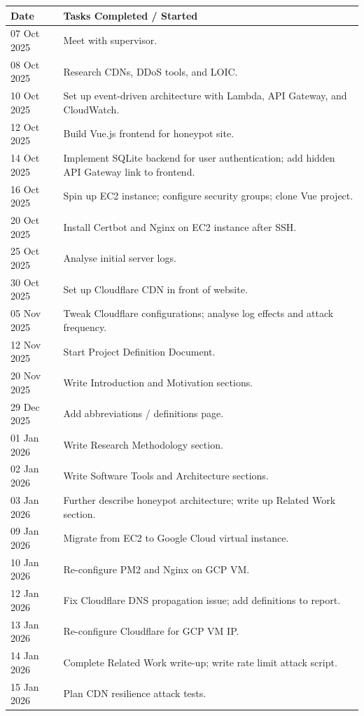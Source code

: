 \documentclass[12pt, a4paper]{report}   %
\begin{document}
\begin{longtable}{p{3cm} p{11cm}}
  \toprule
  \textbf{Date} & \textbf{Tasks Completed / Started} \\
  \midrule
  \endhead
  07 Oct 2025  & Meet with supervisor. \\
  08 Oct 2025  & Research CDNs, DDoS tools, and LOIC. \\
  10 Oct 2025  & Set up event-driven architecture with Lambda, API Gateway, and CloudWatch. \\
  12 Oct 2025  & Build Vue.js frontend for honeypot site. \\
  14 Oct 2025  & Implement SQLite backend for user authentication; add hidden API Gateway link to frontend. \\
  16 Oct 2025  & Spin up EC2 instance; configure security groups; clone Vue project. \\
  20 Oct 2025  & Install Certbot and Nginx on EC2 instance after SSH. \\
  25 Oct 2025  & Analyse initial server logs. \\
  30 Oct 2025  & Set up Cloudflare CDN in front of website. \\
  05 Nov 2025  & Tweak Cloudflare configurations; analyse log effects and attack frequency. \\
  12 Nov 2025  & Start Project Definition Document. \\
  20 Nov 2025  & Write Introduction and Motivation sections. \\
  29 Dec 2025  & Add abbreviations / definitions page. \\
  01 Jan 2026  & Write Research Methodology section. \\
  02 Jan 2026  & Write Software Tools and Architecture sections. \\
  03 Jan 2026  & Further describe honeypot architecture; write up Related Work section. \\
  09 Jan 2026  & Migrate from EC2 to Google Cloud virtual instance. \\
  10 Jan 2026  & Re-configure PM2 and Nginx on GCP VM. \\
  12 Jan 2026  & Fix Cloudflare DNS propagation issue; add definitions to report. \\
  13 Jan 2026  & Re-configure Cloudflare for GCP VM IP. \\
  14 Jan 2026  & Complete Related Work write-up; write rate limit attack script. \\
  15 Jan 2026  & Plan CDN resilience attack tests. \\

\end{longtable}
\end{document}
